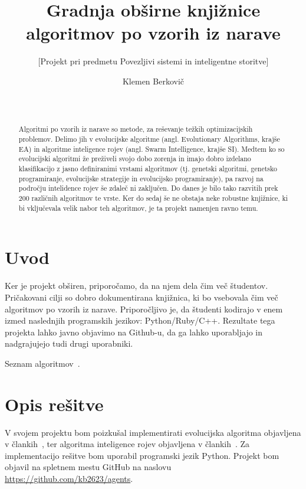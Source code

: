 \documentclass{acm_proc_article-sp}
\begin{document}
\title{Gradnja obširne knjižnice algoritmov po vzorih iz narave}
\subtitle{[Projekt pri predmetu Povezljivi sistemi in inteligentne storitve]}


\author{
\alignauthor
Klemen Berkovič\\
       \\
       \\
\alignauthor
}

\maketitle

\begin{abstract}
Algoritmi po vzorih iz narave so metode, za reševanje težkih optimizacijskih problemov.
Delimo jih v evolucijske algoritme (angl. Evolutionary Algorithms, krajše EA) in algoritme inteligence rojev (angl. Swarm Intelligence, krajše SI).
Medtem ko so evolucijski algoritmi že preživeli svojo dobo zorenja in imajo dobro izdelano klasifikacijo z jasno definiranimi vrstami algoritmov (tj. genetski algoritmi, genetsko programiranje, evolucijske strategije in evolucijsko programiranje), pa razvoj na področju intelidence rojev še zdaleč ni zaključen.
Do danes je bilo tako razvitih prek 200 različnih algoritmov te vrste.
Ker do sedaj še ne obstaja neke robustne knjižnice, ki bi vključevala velik nabor teh algoritmov, je ta projekt namenjen ravno temu.
\end{abstract}


\section{Uvod}
Ker je projekt obširen, priporočamo, da na njem dela čim več študentov.
Pričakovani cilji so dobro dokumentirana knjižnica, ki bo vsebovala čim več algoritmov po vzorih iz narave.
Priporočljivo je, da študenti kodirajo v enem izmed naslednjih programskih jezikov: Python/Ruby/C++.
Rezultate tega projekta lahko javno objavimo na Github-u, da ga lahko uporabljajo in nadgrajujejo tudi drugi uporabniki.

Seznam algoritmov~\cite{DBLP:journals/corr/FisterYFBF13}.

\section{Opis rešitve}
V svojem projektu bom poizkušal implementirati evolucijska algoritma objavljena v člankih~\cite{Brest:2006:SCP:2221387.2221799, Drias:2005:CBS:2152530.2152575}, ter algoritma inteligence rojev objavljena v člankih~\cite{Karaboga2007, Yang2010}.
Za implementacijo rešitve bom uporabil programski jezik Python.
Projekt bom objavil na spletnem mestu GitHub na naslovu \url{https://github.com/kb2623/agents}.


 
\end{document}
